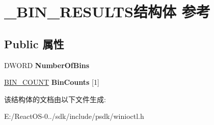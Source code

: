 \hypertarget{struct___b_i_n___r_e_s_u_l_t_s}{}\section{\+\_\+\+B\+I\+N\+\_\+\+R\+E\+S\+U\+L\+T\+S结构体 参考}
\label{struct___b_i_n___r_e_s_u_l_t_s}
\subsection*{Public 属性}
\begin{DoxyCompactItemize}
\item 
\mbox{\label{struct___b_i_n___r_e_s_u_l_t_s_add02a5f2c8f1d3c956f34205f1adab69}} 
D\+W\+O\+RD {\bfseries Number\+Of\+Bins}
\item 
\mbox{\label{struct___b_i_n___r_e_s_u_l_t_s_a4b696cbc857a02055f82f42d7e5bd41e}} 
\hyperlink{struct___b_i_n___c_o_u_n_t}{B\+I\+N\+\_\+\+C\+O\+U\+NT} {\bfseries Bin\+Counts} \mbox{[}1\mbox{]}
\end{DoxyCompactItemize}


该结构体的文档由以下文件生成\+:\begin{DoxyCompactItemize}
\item 
E\+:/\+React\+O\+S-\/0../sdk/include/psdk/winioctl.\+h\end{DoxyCompactItemize}
